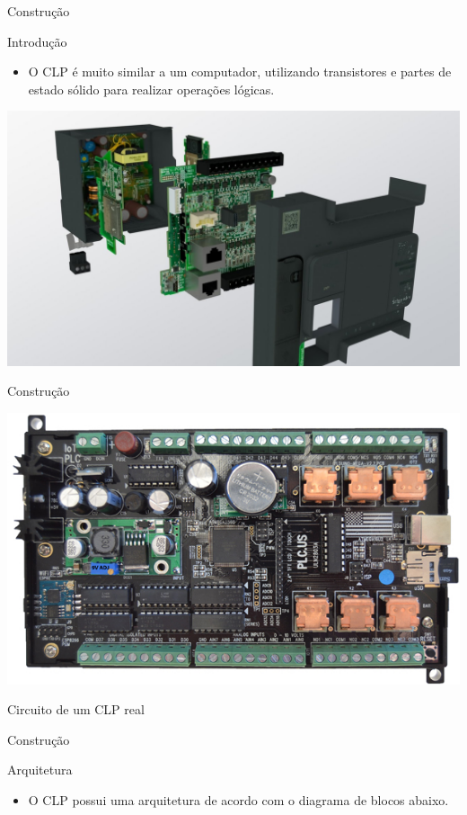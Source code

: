 \begin{frame}{Construção}
	\begin{block}{Introdução}
		\begin{itemize}
			\item O CLP é muito similar a um computador, utilizando transistores e partes de estado sólido para realizar operações lógicas.
		\end{itemize}
	\end{block}

	\centering
	\includegraphics[width=0.8\linewidth]{Figuras/Ch08/fig7}
\end{frame}


\begin{frame}{Construção}
	
	\centering
	\includegraphics[width=0.8\linewidth]{Figuras/Ch08/fig8}
	
	Circuito de um CLP real
\end{frame}


\begin{frame}{Construção}
	\begin{block}{Arquitetura}
		\begin{itemize}
			\item O CLP possui uma arquitetura de acordo com o diagrama de blocos abaixo.
		\end{itemize}
	\end{block}
	
	\centering
	
	
\end{frame}


